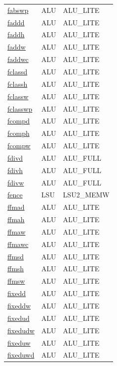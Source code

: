 \begin{small}
\begin{longtable}[l]{l l l}
\hyperlink{lvx.fabswp}{fabswp} & ALU & ALU\_LITE \\ 
\hyperlink{lvx.faddd}{faddd} & ALU & ALU\_LITE \\ 
\hyperlink{lvx.faddh}{faddh} & ALU & ALU\_LITE \\ 
\hyperlink{lvx.faddw}{faddw} & ALU & ALU\_LITE \\ 
\hyperlink{lvx.faddwc}{faddwc} & ALU & ALU\_LITE \\ 
\hyperlink{lvx.fclassd}{fclassd} & ALU & ALU\_LITE \\ 
\hyperlink{lvx.fclassh}{fclassh} & ALU & ALU\_LITE \\ 
\hyperlink{lvx.fclassw}{fclassw} & ALU & ALU\_LITE \\ 
\hyperlink{lvx.fclasswp}{fclasswp} & ALU & ALU\_LITE \\ 
\hyperlink{lvx.fcompd}{fcompd} & ALU & ALU\_LITE \\ 
\hyperlink{lvx.fcomph}{fcomph} & ALU & ALU\_LITE \\ 
\hyperlink{lvx.fcompw}{fcompw} & ALU & ALU\_LITE \\ 
\hyperlink{lvx.fdivd}{fdivd} & ALU & ALU\_FULL \\ 
\hyperlink{lvx.fdivh}{fdivh} & ALU & ALU\_FULL \\ 
\hyperlink{lvx.fdivw}{fdivw} & ALU & ALU\_FULL \\ 
\hyperlink{lvx.fence}{fence} & LSU & LSU2\_MEMW \\ 
\hyperlink{lvx.ffmad}{ffmad} & ALU & ALU\_LITE \\ 
\hyperlink{lvx.ffmah}{ffmah} & ALU & ALU\_LITE \\ 
\hyperlink{lvx.ffmaw}{ffmaw} & ALU & ALU\_LITE \\ 
\hyperlink{lvx.ffmawc}{ffmawc} & ALU & ALU\_LITE \\ 
\hyperlink{lvx.ffmsd}{ffmsd} & ALU & ALU\_LITE \\ 
\hyperlink{lvx.ffmsh}{ffmsh} & ALU & ALU\_LITE \\ 
\hyperlink{lvx.ffmsw}{ffmsw} & ALU & ALU\_LITE \\ 
\hyperlink{lvx.fixedd}{fixedd} & ALU & ALU\_LITE \\ 
\hyperlink{lvx.fixeddw}{fixeddw} & ALU & ALU\_LITE \\ 
\hyperlink{lvx.fixedud}{fixedud} & ALU & ALU\_LITE \\ 
\hyperlink{lvx.fixedudw}{fixedudw} & ALU & ALU\_LITE \\ 
\hyperlink{lvx.fixeduw}{fixeduw} & ALU & ALU\_LITE \\ 
\hyperlink{lvx.fixeduwd}{fixeduwd} & ALU & ALU\_LITE \\ 

\end{longtable}
\end{small}
